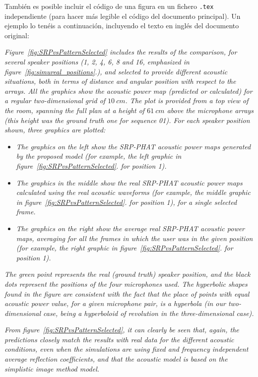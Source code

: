 \documentclass[spanish,openright]{book}
\begin{document}
También es posible incluir el código de una figura en un fichero
\texttt{.tex} independiente (para hacer más legible el código del
documento principal). Un ejemplo lo tenéis a continuación, incluyendo el
texto en inglés del documento original:

\emph{Figure~\ref{fig:SRPvsPatternSelected} includes the results of the
comparison, for several speaker positions (1, 2, 4, 6, 8 and 16,
emphasized in
figure~\ref{fig:simureal_positions}.),
and selected to provide different acoustic situations, both in terms of
distance and angular position with respect to the arrays. All the
graphics show the acoustic power map (predicted or calculated) for a
regular two-dimensional grid of $10~cm$. The plot is provided from a top
view of the room, spanning the full plan at a height of $61~cm$ above the
microphone arrays (this height was the ground truth one for sequence
01). For each speaker position shown, three graphics are plotted:}

\begin{itemize}
\item \emph{The graphics on the left show the SRP-PHAT acoustic power maps
generated by the proposed model (for example, the left graphic in
figure~\ref{fig:SRPvsPatternSelected}.
for position 1).}
\item \emph{The graphics in the middle show the real SRP-PHAT acoustic power
maps calculated using the real acoustic waveforms (for example, the
middle graphic in
figure~\ref{fig:SRPvsPatternSelected}.
for position 1), for a single selected frame.}
\item \emph{The graphics on the right show the average real SRP-PHAT acoustic
power maps, averaging for all the frames in which the user was in the
given position (for example, the right graphic in
figure~\ref{fig:SRPvsPatternSelected}.
for position 1).}
\end{itemize}

\emph{The green point represents the real (ground truth) speaker
position, and the black dots represent the positions of the four
microphones used. The hyperbolic shapes found in the figure are
consistent with the fact that the place of points with equal acoustic
power value, for a given microphone pair, is a hyperbola (in our
two-dimensional case, being a hyperboloid of revolution in the
three-dimensional case).}

\emph{From figure~\ref{fig:SRPvsPatternSelected}, it can clearly be seen that,
again, the predictions closely match the results with real data for the
different acoustic conditions, even when the simulations are using fixed
and frequency independent average reflection coefficients, and that the
acoustic model is based on the simplistic image method model.}
\end{document}
